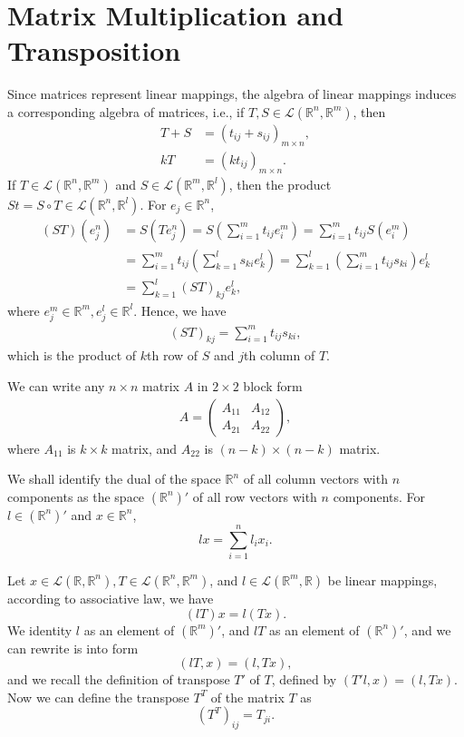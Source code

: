 \documentclass[10pt]{book}
\theoremstyle{definition}
\numberwithin{equation}{chapter}
\begin{document}
\section{Matrix Multiplication and Transposition}
Since matrices represent linear mappings, the algebra of linear mappings induces a corresponding algebra of matrices, i.e., if $T,S\in \mathscr{L}(\mathbb{R}^n,\mathbb{R}^m)$, then
\begin{align*}
    T+S &= (t_{ij} + s_{ij})_{m\times n},\\
    k T &= (kt_{ij})_{m\times n}.
\end{align*}
If $T\in \mathscr{L}(\mathbb{R}^n,\mathbb{R}^m)$ and $S\in \mathscr{L}(\mathbb{R}^m,\mathbb{R}^l)$, then the product $St = S\circ T \in \mathscr{L}(\mathbb{R}^n,\mathbb{R}^l)$. For $e_j\in\mathbb{R}^n$,
\begin{align*}
    (ST)(e_j^n) & = S(Te_j^n) = S\left(\sum^m_{i=1}t_{ij}e^m_i\right) = \sum^m_{i=1}t_{ij} S(e^m_i) \\
    & = \sum^m_{i=1}t_{ij} \left(\sum^l_{k=1}s_{ki}e^l_k\right) = \sum^l_{k=1}\left(\sum^m_{i=1}t_{ij}s_{ki}\right)e^l_k \\
    & = \sum^l_{k=1}(ST)_{kj} e^l_k,
\end{align*}
where $e_j^m\in\mathbb{R}^m,e_j^l\in\mathbb{R}^l$. Hence, we have 
\begin{align*}
    (ST)_{kj} = \sum^m_{i=1}t_{ij}s_{ki},
\end{align*}
which is the product of $k$th row of $S$ and $j$th column of $T$.

We can write any $n\times n$ matrix $A$ in $2\times 2$ block form
\begin{align*}
    A = \left(
        \begin{matrix}
        A_{11} & A_{12} \\
        A_{21} & A_{22} 
        \end{matrix}
    \right),
\end{align*}
where $A_{11}$ is $k\times k$ matrix, and $A_{22}$ is $(n-k)\times(n-k)$ matrix. 

We shall identify the dual of the space $\mathbb{R}^n$ of all column vectors with $n$ components as the space $(\mathbb{R}^n)'$ of all row vectors with $n$ components. For $l\in (\mathbb{R}^n)'$ and $x\in\mathbb{R}^n$, 
$$l x = \sum^n_{i=1}l_ix_i.$$

Let $x\in\mathscr{L}(\mathbb{R},\mathbb{R}^n), T \in \mathscr{L}(\mathbb{R}^n,\mathbb{R}^m)$, and $l \in \mathscr{L}(\mathbb{R}^m,\mathbb{R})$ be linear mappings, according to associative law, we have
$$(lT)x = l(Tx).$$
We identity $l$ as an element of $(\mathbb{R}^m)'$, and $lT$ as an element of $(\mathbb{R}^n)'$, and we can rewrite is into form
$$(lT, x) = (l, Tx),$$
and we recall the definition of transpose $T'$ of $T$, defined by $(T'l, x) = (l, Tx)$. Now we can define the transpose $T^T$ of the matrix $T$ as 
$$\left(T^T\right)_{ij} = T_{ji}.$$
\end{document}
